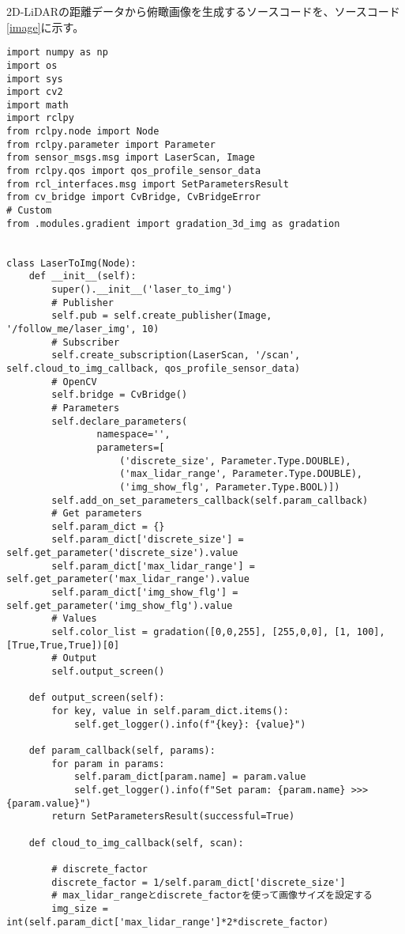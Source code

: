 2D-LiDARの距離データから俯瞰画像を生成するソースコードを、ソースコード\ref{image}に示す。
\begin{lstlisting}[caption=laser\_to\_image.py, label=image]
import numpy as np
import os
import sys
import cv2
import math
import rclpy
from rclpy.node import Node
from rclpy.parameter import Parameter
from sensor_msgs.msg import LaserScan, Image
from rclpy.qos import qos_profile_sensor_data
from rcl_interfaces.msg import SetParametersResult
from cv_bridge import CvBridge, CvBridgeError
# Custom
from .modules.gradient import gradation_3d_img as gradation


class LaserToImg(Node):
    def __init__(self):
        super().__init__('laser_to_img')
        # Publisher
        self.pub = self.create_publisher(Image, '/follow_me/laser_img', 10)
        # Subscriber
        self.create_subscription(LaserScan, '/scan', self.cloud_to_img_callback, qos_profile_sensor_data)
        # OpenCV
        self.bridge = CvBridge()
        # Parameters
        self.declare_parameters(
                namespace='',
                parameters=[
                    ('discrete_size', Parameter.Type.DOUBLE),
                    ('max_lidar_range', Parameter.Type.DOUBLE),
                    ('img_show_flg', Parameter.Type.BOOL)])
        self.add_on_set_parameters_callback(self.param_callback)
        # Get parameters
        self.param_dict = {}
        self.param_dict['discrete_size'] = self.get_parameter('discrete_size').value
        self.param_dict['max_lidar_range'] = self.get_parameter('max_lidar_range').value
        self.param_dict['img_show_flg'] = self.get_parameter('img_show_flg').value
        # Values
        self.color_list = gradation([0,0,255], [255,0,0], [1, 100], [True,True,True])[0]
        # Output
        self.output_screen()

    def output_screen(self):
        for key, value in self.param_dict.items():
            self.get_logger().info(f"{key}: {value}")

    def param_callback(self, params):
        for param in params:
            self.param_dict[param.name] = param.value
            self.get_logger().info(f"Set param: {param.name} >>> {param.value}")
        return SetParametersResult(successful=True)

    def cloud_to_img_callback(self, scan):
        
        # discrete_factor
        discrete_factor = 1/self.param_dict['discrete_size']
        # max_lidar_rangeとdiscrete_factorを使って画像サイズを設定する
        img_size = int(self.param_dict['max_lidar_range']*2*discrete_factor)


\end{lstlisting}
